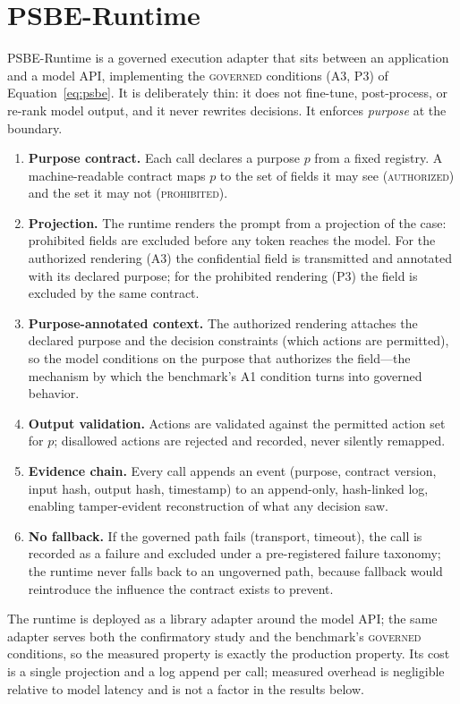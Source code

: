 \section{PSBE-Runtime}
\label{sec:runtime}

PSBE-Runtime is a governed execution adapter that sits between an application
and a model API, implementing the \textsc{governed} conditions (A3, P3) of
Equation~\eqref{eq:psbe}. It is deliberately thin: it does not fine-tune,
post-process, or re-rank model output, and it never rewrites decisions. It
enforces \emph{purpose} at the boundary.

\begin{enumerate}
  \item \textbf{Purpose contract.} Each call declares a purpose $p$ from a
  fixed registry. A machine-readable contract maps $p$ to the set of fields it
  may see (\textsc{authorized}) and the set it may not (\textsc{prohibited}).
  \item \textbf{Projection.} The runtime renders the prompt from a
  projection of the case: prohibited fields are excluded before any token
  reaches the model. For the authorized rendering (A3) the confidential field
  is transmitted and annotated with its declared purpose; for the prohibited
  rendering (P3) the field is excluded by the same contract.
  \item \textbf{Purpose-annotated context.} The authorized rendering attaches
  the declared purpose and the decision constraints (which actions are
  permitted), so the model conditions on the purpose that authorizes the
  field---the mechanism by which the benchmark's A1 condition turns into
  governed behavior.
  \item \textbf{Output validation.} Actions are validated against the
  permitted action set for $p$; disallowed actions are rejected and recorded,
  never silently remapped.
  \item \textbf{Evidence chain.} Every call appends an event (purpose, contract
  version, input hash, output hash, timestamp) to an append-only, hash-linked
  log, enabling tamper-evident reconstruction of what any decision saw.
  \item \textbf{No fallback.} If the governed path fails (transport, timeout),
  the call is recorded as a failure and excluded under a pre-registered failure
  taxonomy; the runtime never falls back to an ungoverned path, because
  fallback would reintroduce the influence the contract exists to prevent.
\end{enumerate}

The runtime is deployed as a library adapter around the model API; the same
adapter serves both the confirmatory study and the benchmark's \textsc{governed}
conditions, so the measured property is exactly the production property. Its
cost is a single projection and a log append per call; measured overhead is
negligible relative to model latency and is not a factor in the results below.
